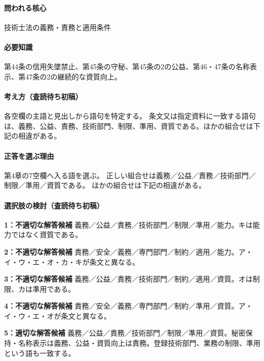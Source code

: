 \paragraph{問われる核心} 技術士法の義務・責務と適用条件

\paragraph{必要知識} 第44条の信用失墜禁止、第45条の守秘、第45条の2の公益、第46・47条の名称表示、第47条の2の継続的な資質向上。

\paragraph{考え方（査読待ち初稿）} 各空欄の主語と見出しから語句を特定する。 条文又は指定資料に一致する語句は、義務、公益、責務、技術部門、制限、準用、資質である。ほかの組合せは下記の相違がある。

\paragraph{正答を選ぶ理由} 第4章の7空欄へ入る語を選ぶ。 正しい組合せは義務／公益／責務／技術部門／制限／準用／資質である。 ほかの組合せは下記の相違がある。

\paragraph{選択肢の検討（査読待ち初稿）}\mbox{}\par

\noindent\textbf{1：不適切な解答候補} 義務／公益／責務／技術部門／制限／準用／能力。キは能力ではなく資質である。\par

\noindent\textbf{2：不適切な解答候補} 責務／安全／義務／専門部門／制約／適用／能力。ア・イ・ウ・エ・オ・カ・キが条文と異なる。\par

\noindent\textbf{3：不適切な解答候補} 義務／公益／責務／技術部門／制約／適用／資質。オは制限、カは準用である。\par

\noindent\textbf{4：不適切な解答候補} 責務／安全／義務／専門部門／制約／準用／資質。ア・イ・ウ・エ・オが条文と異なる。\par

\noindent\textbf{5：適切な解答候補} 義務／公益／責務／技術部門／制限／準用／資質。秘密保持・名称表示は義務、公益・資質向上は責務。登録技術部門、業務の制限、準用という語も一致する。\par

